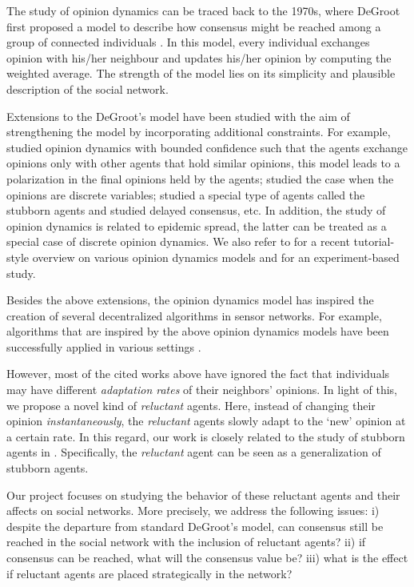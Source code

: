 \documentclass[letter]{article}
\theoremstyle{remark}
\begin{document}
The study of opinion dynamics can be traced back to the 1970s, where DeGroot  first proposed a model to describe how consensus might be reached among a group of connected individuals \cite{Degroot_74}. In this model, every individual exchanges opinion with his/her neighbour and updates his/her opinion by computing the weighted average. The strength of the model lies on its simplicity and plausible description of the social network. 

Extensions to the DeGroot's model have been studied with the aim of strengthening the model by incorporating additional constraints. For example, \cite{Hegselmann02} studied opinion dynamics with bounded confidence such that the agents exchange opinions only with other agents that hold similar opinions, this model leads to a polarization in the final opinions held by the agents; \cite{Holley1975} studied the case when the opinions are discrete variables; \cite{Acemoglu2013,Yildiz2011} studied a special type of agents called the stubborn agents and \cite{Nedic2010} studied delayed consensus, etc.
In addition, the study of opinion dynamics is related to epidemic spread, the latter can be treated as a special case of discrete opinion dynamics. We also refer to \cite{Fagnani2014} for a recent tutorial-style overview on various opinion dynamics models and \cite{Das2014} for an experiment-based study. 

Besides the above extensions, the opinion dynamics model has inspired the creation of several decentralized algorithms in sensor networks. For example, algorithms that are inspired by the above opinion dynamics models have been successfully applied in various settings \cite{Dimakis2010}. 

However, most of the cited works above have ignored the fact that individuals may have different \emph{adaptation rates} of their neighbors' opinions. In light of this, we propose a novel kind of \emph{reluctant} agents. Here, instead of changing their opinion \emph{instantaneously}, the \emph{reluctant} agents slowly adapt to the `new' opinion at a certain rate.
In this regard, our work is closely related to the study of stubborn agents in \cite{Acemoglu2013}. Specifically, the \emph{reluctant} agent can be seen as a generalization of stubborn agents. 

Our project focuses on studying the behavior of these reluctant agents and their affects on social networks.
More precisely, we address the following issues: i) despite the departure from standard DeGroot's model, can consensus still be reached in the social network with the inclusion of reluctant agents? ii) if consensus can be reached, what will the consensus value be? iii) what is the effect if reluctant agents are placed strategically in the network?
\end{document}
